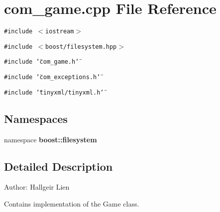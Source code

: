 \section{com\_\-game.cpp File Reference}
\label{com__game_8cpp}
{\tt \#include $<$iostream$>$}\par
{\tt \#include $<$boost/filesystem.hpp$>$}\par
{\tt \#include \char`\"{}com\_\-game.h\char`\"{}}\par
{\tt \#include \char`\"{}com\_\-exceptions.h\char`\"{}}\par
{\tt \#include \char`\"{}tinyxml/tinyxml.h\char`\"{}}\par
\subsection*{Namespaces}
\begin{CompactItemize}
\item 
namespace \textbf{boost::filesystem}
\end{CompactItemize}


\subsection{Detailed Description}
\begin{Desc}
\item[Author:]Hallgeir Lien\end{Desc}
Contains implementation of the Game class. 